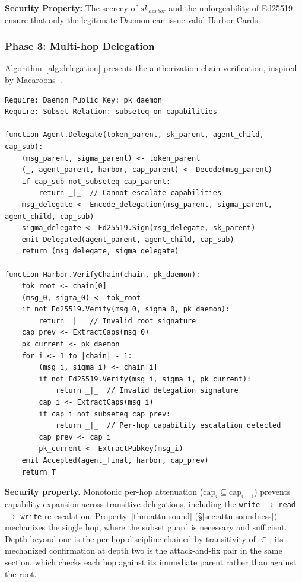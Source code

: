 \documentclass[11pt,a4paper]{article}
\theoremstyle{definition}
\begin{document}
\textbf{Security Property:} The secrecy of $sk_{harbor}$ and the unforgeability of Ed25519~ ensure that only the legitimate Daemon can issue valid Harbor Cards.

\subsubsection{Phase 3: Multi-hop Delegation}\label{sec:delegation}

Algorithm~\ref{alg:delegation} presents the authorization chain verification, inspired by Macaroons~.

\begin{lstlisting}[caption={Algorithm 3: Authorization Chain Verification},label={alg:delegation}]
Require: Daemon Public Key: pk_daemon
Require: Subset Relation: subseteq on capabilities

function Agent.Delegate(token_parent, sk_parent, agent_child, cap_sub):
    (msg_parent, sigma_parent) <- token_parent
    (_, agent_parent, harbor, cap_parent) <- Decode(msg_parent)
    if cap_sub not_subseteq cap_parent:
        return _|_  // Cannot escalate capabilities
    msg_delegate <- Encode_delegation(msg_parent, sigma_parent, agent_child, cap_sub)
    sigma_delegate <- Ed25519.Sign(msg_delegate, sk_parent)
    emit Delegated(agent_parent, agent_child, cap_sub)
    return (msg_delegate, sigma_delegate)

function Harbor.VerifyChain(chain, pk_daemon):
    tok_root <- chain[0]
    (msg_0, sigma_0) <- tok_root
    if not Ed25519.Verify(msg_0, sigma_0, pk_daemon):
        return _|_  // Invalid root signature
    cap_prev <- ExtractCaps(msg_0)
    pk_current <- pk_daemon
    for i <- 1 to |chain| - 1:
        (msg_i, sigma_i) <- chain[i]
        if not Ed25519.Verify(msg_i, sigma_i, pk_current):
            return _|_  // Invalid delegation signature
        cap_i <- ExtractCaps(msg_i)
        if cap_i not_subseteq cap_prev:
            return _|_  // Per-hop capability escalation detected
        cap_prev <- cap_i
        pk_current <- ExtractPubkey(msg_i)
    emit Accepted(agent_final, harbor, cap_prev)
    return T
\end{lstlisting}

\textbf{Security property.} Monotonic per-hop attenuation ($\text{cap}_i \subseteq \text{cap}_{i-1}$) prevents capability expansion across transitive delegations, including the \texttt{write} $\to$ \texttt{read} $\to$ \texttt{write} re-escalation. Property~\ref{thm:attn-sound} (\S\ref{sec:attn-soundness}) mechanizes the single hop, where the subset guard is necessary and sufficient. Depth beyond one is the per-hop discipline chained by transitivity of $\subseteq$; its mechanized confirmation at depth two is the attack-and-fix pair in the same section, which checks each hop against its immediate parent rather than against the root.
\end{document}
